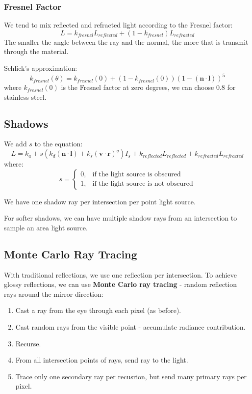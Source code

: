 \documentclass[11pt]{article}
\begin{document}
\subsubsection{Fresnel Factor}
We tend to mix reflected and refracted light according to the Fresnel factor:
\[
  L = k_{fresnel} L_{reflected} + (1 - k_{fresnel}) L_{refracted} 
\]
The smaller the angle between the ray and the normal, the more that is transmit through the material.

Schlick's approximation:
\[
  k_{fresnel} (\theta) = k_{fresnel} (0) + (1 - k_{fresnel}(0)) (1 - (\bm{n} \cdot \bm{l}))^5
\]
where $k_{fresnel}(0)$ is the Fresnel factor at zero degrees, we can choose $0.8$ for stainless steel.

\subsection{Shadows}
We add $s$ to the equation:
\[
  L = k_a + s(k_d (\bm{n} \cdot \bm{l}) + k_s(\bm{v} \cdot \bm{r})^q)I_s + k_{reflected} L_{reflected} + k_{refracted}L_{refracted}
\]
where:
\[
  s =
  \begin{cases}
    0, & \text{if the light source is obscured} \\
    1, & \text{if the light source is not obscured}
  \end{cases}
\]

We have one shadow ray per intersection per point light source.

For softer shadows, we can have multiple shadow rays from an intersection to sample an area light source.

\subsection{Monte Carlo Ray Tracing}
With traditional reflections, we use one reflection per intersection.
To achieve glossy reflections, we can use \textbf{Monte Carlo ray tracing} - random reflection rays around the mirror direction:
\begin{enumerate}
  \item Cast a ray from the eye through each pixel (as before).
  \item Cast random rays from the visible point - accumulate radiance contribution.
  \item Recurse.
  \item From all intersection points of rays, send ray to the light.
  \item Trace only one secondary ray per recusrion, but send many primary rays per pixel.
\end{enumerate}
\end{document}
